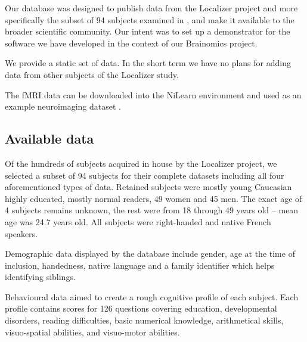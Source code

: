 \documentclass[review]{elsarticle}
\begin{document}
Our database was designed to publish data from the Localizer project \cite{Pinel2007} and more specifically the subset of 94 subjects examined in \cite{Pinel2012}, and make it available to the broader scientific community. Our intent was to set up a demonstrator for the software we have developed in the context of our Brainomics project.

We provide a static set of data. In the short term we have no plans for adding data from other subjects of the Localizer study.

The fMRI data can be downloaded into the NiLearn environment and used as an example neuroimaging dataset \cite{NiLearn_Localizer}.


\subsection{Available data}

Of the hundreds of subjects acquired in house by the Localizer project, we selected a subset of 94 subjects for their complete datasets \cite{Pinel2012} including all four aforementioned types of data. Retained subjects were mostly young Caucasian highly educated, mostly normal readers, 49 women and 45 men. The exact age of 4 subjects remains unknown, the rest were from 18 through 49 years old -- mean age was 24.7 years old. All subjects were right-handed and native French speakers.

Demographic data displayed by the database include gender, age at the time of inclusion, handedness, native language and a family identifier which helps identifying siblings.

Behavioural data aimed to create a rough cognitive profile of each subject. Each profile contains scores for 126 questions covering education, developmental disorders, reading difficulties, basic numerical knowledge, arithmetical skills, visuo-spatial abilities, and visuo-motor abilities.
\end{document}
